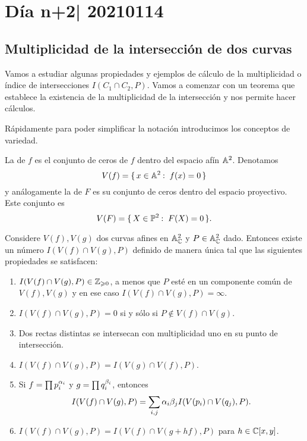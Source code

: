 \documentclass[12pt]{memoir}
\begin{document}
\section{Día n+2| 20210114}

\subsection{Multiplicidad de la intersección de dos curvas}
Vamos a estudiar algunas propiedades y ejemplos de cálculo de la multiplicidad o índice de intersecciones $I(C_1\cap C_2,P)$. Vamos a comenzar con un teorema que establece la existencia de la multiplicidad de la intersección y nos permite hacer cálculos.\par

Rápidamente para poder simplificar la notación introducimos los conceptos de variedad.

\begin{Def}
  La  de $f$ es el conjunto de ceros de $f$ dentro del espacio afín $\mathbb{A}^2$. Denotamos
  $$V(f)=\set{x\in\bA^2\:\ f(x)=0}$$
  y análogamente la  de $F$ es su conjunto de ceros dentro del espacio proyectivo. Este conjunto es
  $$V(F)=\set{X\in\bP^2\:\ F(X)=0}.$$
\end{Def}
\begin{Th}
  Considere $V(f),V(g)$ dos curvas afines en $\mathbb{A}_{\mathbb{C}}^2$ y $P\in\mathbb{A}_{\mathbb{C}}^2$ dado. Entonces existe un número $I(V(f)\cap V(g),P)$ definido de manera única tal que las siguientes propiedades se satisfacen:
  \begin{enumerate}
    \item $I(V(f)\cap V(g),P)\in\mathbb{Z}_{\geqslant 0}$, a menos que $P$ esté en un componente común de $V(f),V(g)$ y en ese caso $I(V(f)\cap V(g),P)=\infty$.
    \item $I(V(f)\cap V(g),P)=0$ si y sólo si $P\not\in V(f)\cap V(g)$.
    \item Dos rectas distintas se intersecan con multiplicidad uno en su punto de intersección.
    \item $I(V(f)\cap V(g),P)=I(V(g)\cap V(f),P)$.
    \item Si $f=\prod p_i^{\alpha_i}$ y $g=\prod q_i^{\beta_i}$, entonces
    $$I(V(f)\cap V(g),P)=\sum_{i,j}\alpha_i\beta_jI(V(p_i)\cap V(q_j),P).$$
    \item $I(V(f)\cap V(g),P)=I(V(f)\cap V(g+hf),P)$ para $h\in\mathbb{C}[x,y]$.
 \end{enumerate}
\end{Th}
\end{document}
